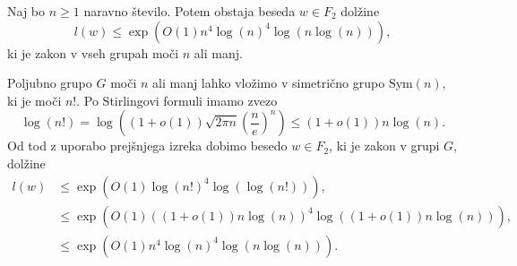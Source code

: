 
\begin{posledica}\label{psl_zakon_v_splosni_grupi}
    Naj bo $n \ge 1$ naravno število. Potem obstaja beseda $w \in F_2$ dolžine \begin{equation*}
        l(w) \le \exp{\left( O(1) n^4 \log(n)^4 \log(n \log(n)) \right)},
    \end{equation*}
    ki je zakon v vseh grupah moči $n$ ali manj.
\end{posledica}
\begin{dokaz}
    Poljubno grupo $G$ moči $n$ ali manj lahko vložimo v simetrično grupo $\text{Sym}(n)$, ki je moči $n!$. Po Stirlingovi formuli imamo zvezo \begin{equation*}
       \log(n!) = \log \left( (1+ o(1)) \sqrt{2 \pi n} \left( \frac{n}{e} \right)^n   \right) \le (1 + o(1)) n \log(n).
    \end{equation*}
    Od tod z uporabo prejšnjega izreka dobimo besedo $w \in F_2$, ki je zakon v grupi $G$, dolžine \begin{align*}
        l(w) &\le  \exp{\left(O(1) \log(n!)^4 \log(\log(n!))\right)}, \\
            &\le \exp{\left(O(1) ((1 + o(1)) n \log(n))^4 \log((1 + o(1)) n \log(n))\right)}, \\
            &\le \exp{\left( O(1) n^4 \log(n)^4 \log(n \log(n)) \right)}.
    \end{align*}\end{dokaz}


